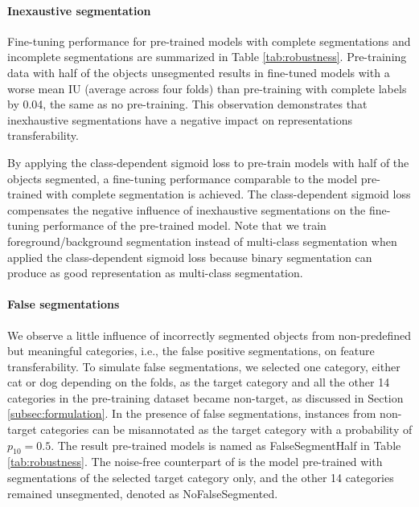 \paragraph{Inexaustive segmentation}
Fine-tuning performance for pre-trained models with complete segmentations and incomplete segmentations are summarized in Table \ref{tab:robustness}.
Pre-training data with half of the objects unsegmented results in fine-tuned models with a worse mean IU (average across four folds) than pre-training with complete labels by 0.04, the same as no pre-training.
This observation demonstrates that inexhaustive segmentations have a negative impact on representations transferability.

By applying the class-dependent sigmoid loss to pre-train models with half of the objects segmented, a fine-tuning performance comparable to the model pre-trained with complete segmentation is achieved.
The class-dependent sigmoid loss compensates the negative influence of inexhaustive segmentations on the fine-tuning performance of the pre-trained model.
Note that we train foreground/background segmentation instead of multi-class segmentation when applied the class-dependent sigmoid loss because binary segmentation can produce as good representation as multi-class segmentation.


\paragraph{False segmentations}
We observe a little influence of incorrectly segmented objects from non-predefined but meaningful categories, i.e., the false positive segmentations, on feature transferability.
To simulate false segmentations, we selected one category, either cat or dog depending on the folds, as the target category and all the other 14 categories in the pre-training dataset became non-target, as discussed in Section \ref{subsec:formulation}.
In the presence of false segmentations, instances from non-target categories can be misannotated as the target category with a probability of $p_{10}= 0.5$.
The result pre-trained models is named as FalseSegmentHalf in Table \ref{tab:robustness}.
The noise-free counterpart of is the model pre-trained with segmentations of the selected target category only, and the other 14 categories remained unsegmented, denoted as NoFalseSegmented.

